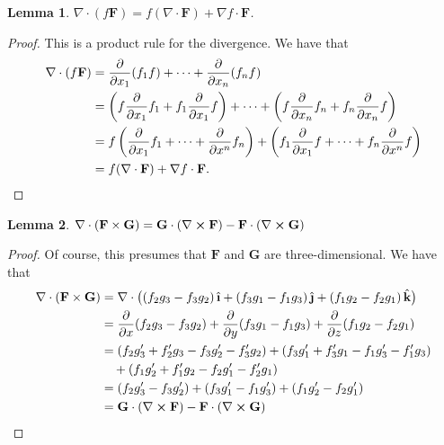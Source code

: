 \documentclass[11pt]{article}
\newtheorem*{lemma*}{Lemma}
\newcommand{\uvec}[1]{\mathop{} \!\hat{\textbf{#1}}}
\renewcommand{\div}{\nabla \cdot}
\renewcommand{\curl}{\nabla \cross}
\renewcommand{\grad}{\nabla}
\begin{document}

\begin{lemma*}
	$\div (f \mathbf{F}) = f (\div \mathbf{F}) + \grad f \cdot \mathbf{F}$.
\end{lemma*}
\begin{adjustwidth}{0.7cm}{}
    \begin{proof}\renewcommand{\qedsymbol}{}
		This is a product rule for the divergence. We have that
		\begin{align*}
			\div (f \mathbf{F}) &= \pdv{x_{1}} (f_{1}f) + \cdots + \pdv{x_{n}} (f_{n}f) \\
			&= \left( f \pdv{x_{1}}f_{1} + f_{1} \pdv{x_{1}} f \right) + \cdots + \left( f \pdv{x_{n}} f_{n} + f_{n} \pdv{x_{n}} f \right) \\
			&= f \left( \pdv{x_{1}} f_{1} + \cdots + \pdv{x^{n}} f_{n} \right) + \left( f_{1} \pdv{x_{1}} f + \cdots + f_{n} \pdv{x^{n}} f \right) \\
			&= f (\div \mathbf{F}) + \grad f \cdot \mathbf{F}.
		\end{align*}
	\end{proof}
\end{adjustwidth}

\begin{lemma*}
	$\div (\mathbf{F} \times \mathbf{G}) = \mathbf{G} \cdot (\curl \mathbf{F}) - \mathbf{F} \cdot (\curl \mathbf{G})$
\end{lemma*}
\begin{adjustwidth}{0.7cm}{}
    \begin{proof}\renewcommand{\qedsymbol}{}
		Of course, this presumes that $\mathbf{F}$ and $\mathbf{G}$ are three-dimensional. We have that
		\begin{align*}
			\div (\mathbf{F} \times \mathbf{G}) &= \div \big( (f_{2}g_{3} - f_{3}g_{2}) \uvec{\i} + (f_{3}g_{1} - f_{1}g_{3}) \uvec{\j} + (f_{1}g_{2} - f_{2}g_{1}) \uvec{k} \big) \\
			&= \pdv{x} (f_{2}g_{3} - f_{3}g_{2}) + \pdv{y} (f_{3}g_{1} - f_{1}g_{3}) + \pdv{z} (f_{1}g_{2} - f_{2}g_{1}) \\
			&= (f_{2} g_{3}' + f_{2}'g_{3} - f_{3}g_{2}' - f_{3}'g_{2}) + (f_{3}g_{1}' + f_{3}'g_{1} - f_{1}g_{3}' - f_{1}'g_{3}) \\
			& \quad + (f_{1}g_{2}' + f_{1}'g_{2} - f_{2}g_{1}' - f_{2}'g_{1}) \\
			&= (f_{2}g_{3}' - f_{3}g_{2}') + (f_{3}g_{1}' - f_{1}g_{3}') + (f_{1}g_{2}' - f_{2}g_{1}') \\
			&= \mathbf{G} \cdot (\curl \mathbf{F}) - \mathbf{F} \cdot (\curl \mathbf{G})
		\end{align*}
	\end{proof}
\end{adjustwidth}
\end{document}
